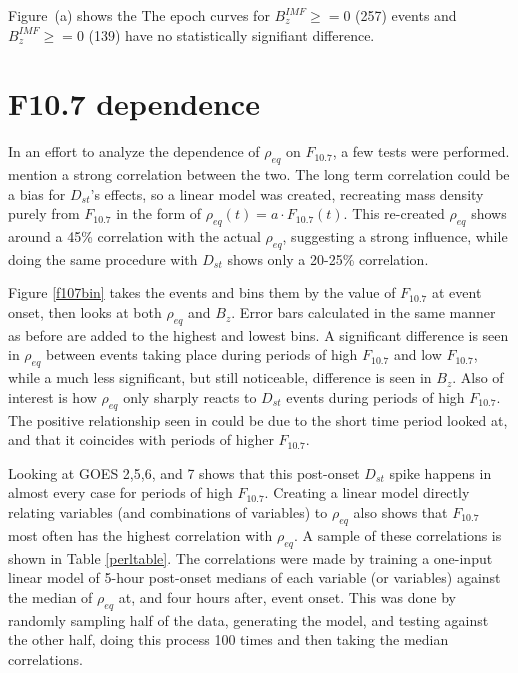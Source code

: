 \documentclass[10pt,twocolumn]{article}
\begin{document}
Figure~\label{fig:RhoBinned}(a) shows the 
The epoch curves for $B_z^{IMF}\geq=0$ (257) events and $B_z^{IMF}\ge=0$ (139) have no statistically signifiant difference.

\section{F10.7 dependence}
In an effort to analyze the dependence of $\rho_{eq}$ on $F_{10.7}$, a few tests were performed. \cite{Takahashi2010} mention a strong correlation between the two. The long term correlation could be a bias for $D_{st}$'s effects, so a linear model was created, recreating mass density purely from $F_{10.7}$ in the form of $\rho_{eq}(t)=a\cdot F_{10.7}(t)$. This re-created $\rho_{eq}$ shows around a 45\% correlation with the actual $\rho_{eq}$, suggesting a strong influence, while doing the same procedure with $D_{st}$ shows only a 20-25\% correlation. 

Figure \ref{f107bin} takes the events and bins them by the value of $F_{10.7}$ at event onset, then looks at both $\rho_{eq}$ and $B_z$. Error bars calculated in the same manner as before are added to the highest and lowest bins. A significant difference is seen in $\rho_{eq}$ between events taking place during periods of high $F_{10.7}$ and low $F_{10.7}$, while a much less significant, but still noticeable, difference is seen in $B_z$. Also of interest is how $\rho_{eq}$ only sharply reacts to $D_{st}$ events during periods of high $F_{10.7}$. The positive relationship seen in \cite{Takahashi2010} could be due to the short time period looked at, and that it coincides with periods of higher $F_{10.7}$.

Looking at GOES 2,5,6, and 7 shows that this post-onset $D_{st}$ spike happens in almost every case for periods of high $F_{10.7}$. Creating a linear model directly relating variables (and combinations of variables) to $\rho_{eq}$ also shows that $F_{10.7}$ most often has the highest correlation with $\rho_{eq}$. A sample of these correlations is shown in Table \ref{perltable}. The correlations were made by training a one-input linear model of 5-hour post-onset medians of each variable (or variables) against the median of $\rho_{eq}$ at, and four hours after, event onset. This was done by randomly sampling half of the data, generating the model, and testing against the other half, doing this process 100 times and then taking the median correlations.

\newpage
\footnotesize


\end{document}
